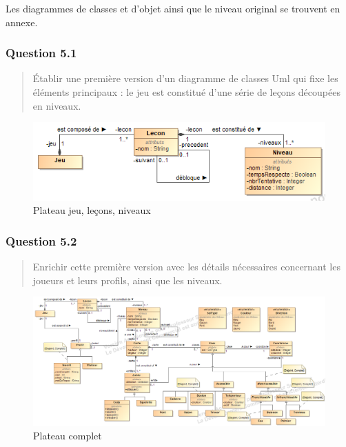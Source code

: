 \documentclass[]{article}
\begin{document}
Les diagrammes de classes et d'objet ainsi que le niveau original se
trouvent en annexe.

\hypertarget{question-5.1}{%
\subsubsection{Question 5.1}\label{question-5.1}}

\begin{quote}
Établir une première version d'un diagramme de classes Uml qui fixe les
éléments principaux : le jeu est constitué d'une série de leçons
découpées en niveaux.
\end{quote}

\begin{figure}
\centering
\includegraphics{./images_final/PlateauQ1.png}
\caption{Plateau jeu, leçons, niveaux}
\end{figure}

\hypertarget{question-5.2}{%
\subsubsection{Question 5.2}\label{question-5.2}}

\begin{quote}
Enrichir cette première version avec les détails nécessaires concernant
les joueurs et leurs profils, ainsi que les niveaux.
\end{quote}

\begin{figure}
\centering
\includegraphics[angle=90, width=\textwidth, height=\textheight, keepaspectratio]{./images_final/PlateauQ2.png}
\caption{Plateau complet}
\end{figure}
\end{document}
